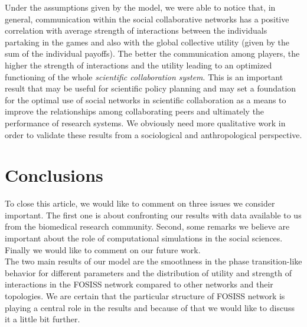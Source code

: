 \documentclass{bmcart}
\begin{document}
  Under the assumptions given by the model, we were able to
  notice that, in general, communication within the social
  collaborative networks has a positive correlation with average
  strength of interactions between the individuals partaking in the
  games and also with the global collective utility (given by the sum
  of the individual payoffs). The better the communication among
  players, the higher the strength of interactions and the utility
  leading to an optimized functioning of the whole \emph{scientific
    collaboration system}. This is an important result that may be
  useful for scientific policy planning and may set a foundation for
  the optimal use of social networks in scientific collaboration as a
  means to improve the relationships among collaborating peers and
  ultimately the performance of research systems.  We obviously need
  more qualitative work in order to validate these results from a
  sociological and anthropological perspective.\\


  \section*{Conclusions}
  
  
 To close this article, we would like to comment on three
  issues we consider important. The first one is about confronting our
  results with data available to us from the biomedical research
  community. Second, some remarks we believe are important about the
  role of computational simulations in the social sciences. Finally we
  would like to comment on our future work.\\


  The two main results of our model are the smoothness in
  the phase transition-like behavior for different parameters and the
  distribution of utility and strength of interactions in the FOSISS
  network compared to other networks and their topologies. We are
  certain that the particular structure of FOSISS network is playing a
  central role in the results and because of that we would like to
  discuss it a little bit further.\\
\end{document}
